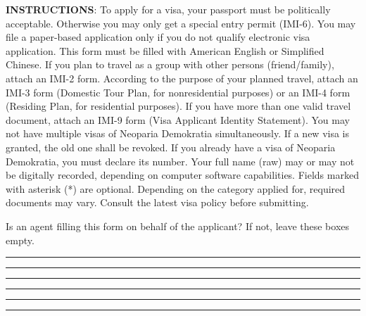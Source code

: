 




\begin{minipage}{\textwidth}
	\small
	\textbf{INSTRUCTIONS}:
	\inlinelistitem To apply for a visa, your passport must be politically acceptable. Otherwise you may only get a special entry permit (IMI-6).
	\inlinelistitem You may file a paper-based application only if you do not qualify electronic visa application.
	\inlinelistitem This form must be filled with American English or Simplified Chinese.
	\inlinelistitem If you plan to travel as a group with other persons (friend/family), attach an IMI-2 form.
	\inlinelistitem According to the purpose of your planned travel, attach an IMI-3 form (Domestic Tour Plan, for nonresidential purposes) or an IMI-4 form (Residing Plan, for residential purposes).
	\inlinelistitem If you have more than one valid travel document, attach an IMI-9 form (Visa Applicant Identity Statement).
	\inlinelistitem You may not have multiple visas of Neoparia Demokratia simultaneously. If a new visa is granted, the old one shall be revoked. If you already have a visa of Neoparia Demokratia, you must declare its number.
	\inlinelistitem Your full name (raw) may or may not be digitally recorded, depending on computer software capabilities.
	\inlinelistitem Fields marked with asterisk (*) are optional.
	\inlinelistitem Depending on the category applied for, required documents may vary. Consult the latest visa policy before submitting.
\end{minipage}
\vskip 10pt




\formbrickcontentheight=27pt

\textsf{\small Is an agent filling this form on behalf of the applicant? If not, leave these boxes empty.}
\par\hrule
\formbrickVlineLeft%
\formbrickVlineMid%
\formbrickVlineRight%
\par\hrule
\vskip 5pt

\formbrickcontentheight=33pt

\par\hrule
\formbrickVlineLeft%
\formbrickVlineRight%
\par\hrule
\formbrickVlineLeft%
\formbrickVlineRight%
\par\hrule
\formbrickVlineLeft%
\formbrickVlineRight%
\par\hrule
\vskip 5pt


